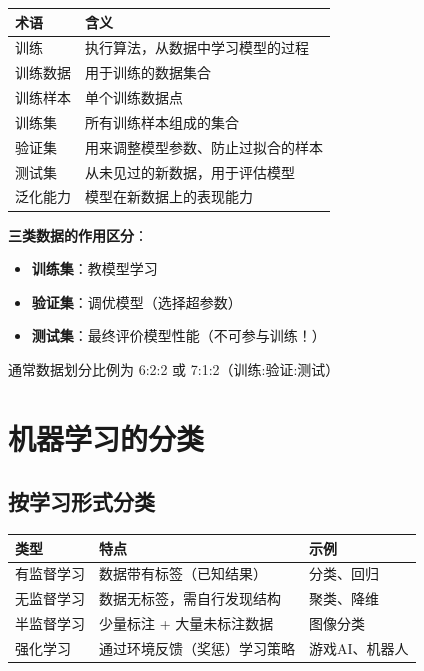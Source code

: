 \begin{table}[htbp]
\centering\small
\begin{tabular}{ll}
\toprule
\textbf{术语} & \textbf{含义} \\
\midrule
训练 & 执行算法，从数据中学习模型的过程 \\
训练数据 & 用于训练的数据集合 \\
训练样本 & 单个训练数据点 \\
训练集 & 所有训练样本组成的集合 \\
验证集 & 用来调整模型参数、防止过拟合的样本 \\
测试集 & 从未见过的新数据，用于评估模型 \\
泛化能力 & 模型在新数据上的表现能力 \\
\bottomrule
\end{tabular}
\end{table}

\begin{notebox}
\textbf{三类数据的作用区分}：
\begin{itemize}[itemsep=0pt]
    \item \textbf{训练集}：教模型学习
    \item \textbf{验证集}：调优模型（选择超参数）
    \item \textbf{测试集}：最终评价模型性能（不可参与训练！）
\end{itemize}

通常数据划分比例为 6:2:2 或 7:1:2（训练:验证:测试）
\end{notebox}

\section{机器学习的分类}

\subsection{按学习形式分类}

\begin{table}[htbp]
\centering\small
\begin{tabular}{lll}
\toprule
\textbf{类型} & \textbf{特点} & \textbf{示例} \\
\midrule
有监督学习 & 数据带有标签（已知结果） & 分类、回归 \\
无监督学习 & 数据无标签，需自行发现结构 & 聚类、降维 \\
半监督学习 & 少量标注 + 大量未标注数据 & 图像分类 \\
强化学习 & 通过环境反馈（奖惩）学习策略 & 游戏AI、机器人 \\
\bottomrule
\end{tabular}
\end{table}


